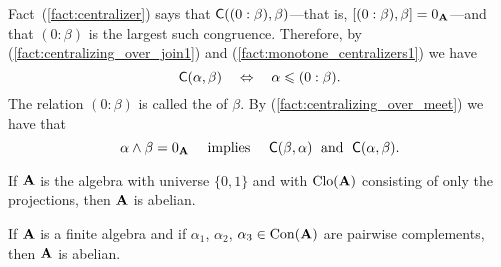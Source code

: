 \begin{remarks}
Fact~(\ref{fact:centralizer}) says
 that $\mathsf{C}((0:\beta), \beta)$---that is, 
$[(0:\beta), \beta] = 0_{\mathbf{A}}$---and that $(0:\beta)$ is the largest such
 congruence. 
Therefore, by (\ref{fact:centralizing_over_join1}) and (\ref{fact:monotone_centralizers1}) 
we have %
\begin{equation}
\label{fact:centralizing_ideal}
  \mathsf{C}(\alpha, \beta) 
\quad \Leftrightarrow \quad
\alpha \leqslant (0: \beta).
\end{equation}
The relation $(0:\beta)$ is called the  
of $\beta$.
By (\ref{fact:centralizing_over_meet}) we have that
\begin{equation}
\label{fact:point-separating_implies_mutually-centralizing}    
\alpha \wedge \beta = 0_{\mathbf{A}}  
\quad \text{ implies } \quad 
\mathsf{C}(\beta, \alpha) 
\; \text{ and } \;
\mathsf{C}(\alpha, \beta).
\end{equation}

\end{remarks}

\begin{lemma}
If $\mathbf{A}$ is the algebra with universe $\{0,1\}$ and with $\operatorname{Clo}(\mathbf{A})$ consisting
of only the projections, then $\mathbf{A}$ is abelian.
\end{lemma}

\begin{lemma}
If $\mathbf{A}$ is a finite algebra and if 
$\alpha_1$, $\alpha_2$, $\alpha_3 \in \operatorname{Con}(\mathbf{A})$ are pairwise complements, 
then $\mathbf{A}$ is abelian.
\end{lemma}


